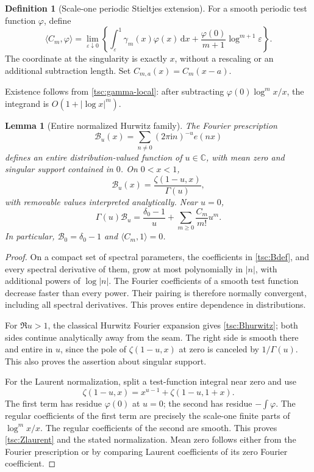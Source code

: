 \documentclass[11pt]{article}
\numberwithin{equation}{section}
\newtheorem{lemma}[theorem]{Lemma}
\theoremstyle{definition}\newtheorem{definition}[theorem]{Definition}
\theoremstyle{remark}\newtheorem{remark}[theorem]{Remark}
\newcommand{\ii}{\mathrm i}
\newcommand{\dd}{\,\mathrm d}
\newcommand{\CC}{\mathbb C}
\newcommand{\calB}{\mathcal B}
\begin{document}
\begin{definition}[Scale-one periodic Stieltjes extension]\label{tsc:Cdef}
For a smooth periodic test function $\varphi$, define
\begin{equation}\label{tsc:Cfp}
 \langle C_m,\varphi\rangle=
 \lim_{\varepsilon\downarrow0}\left\{
   \int_{\varepsilon}^{1}\gamma_m(x)\varphi(x)\dd x
    +\frac{\varphi(0)}{m+1}\log^{m+1}\varepsilon\right\}.
\end{equation}
The coordinate at the singularity is exactly $x$, without a rescaling or
an additional subtraction length. Set $C_{m,a}(x)=C_m(x-a)$.
\end{definition}
Existence follows from \eqref{tsc:gamma-local}: after subtracting
$\varphi(0)\log^m x/x$, the integrand is $O(1+|\log x|^m)$.

\begin{lemma}[Entire normalized Hurwitz family]\label{tsc:entire-B}
The Fourier prescription
\begin{equation}\label{tsc:Bdef}
 \calB_u(x)=\sum_{n\ne0}(2\pi\ii n)^{-u}e(nx)
\end{equation}
defines an entire distribution-valued function of $u\in\CC$, with mean
zero and singular support contained in $0$. On $0<x<1$,
\begin{equation}\label{tsc:Bhurwitz}
 \calB_u(x)=\frac{\zeta(1-u,x)}{\Gamma(u)},
\end{equation}
with removable values interpreted analytically. Near $u=0$,
\begin{equation}\label{tsc:Zlaurent}
 \Gamma(u)\calB_u=\frac{\delta_0-1}{u}
          +\sum_{m\ge0}\frac{C_m}{m!}u^m.
\end{equation}
In particular, $\calB_0=\delta_0-1$ and $\langle C_m,1\rangle=0$.
\end{lemma}
\begin{proof}
On a compact set of spectral parameters, the coefficients in
\eqref{tsc:Bdef}, and every spectral derivative of them, grow at most
polynomially in $|n|$, with additional powers of $\log|n|$. The Fourier
coefficients of a smooth test function decrease faster than every power.
Their pairing is therefore normally convergent, including all spectral
derivatives. This proves entire dependence in distributions.

For $\Re u>1$, the classical Hurwitz Fourier expansion
\cite[Eq.~25.11.9]{tsc:dlmf-zeta} gives \eqref{tsc:Bhurwitz}; both sides
continue analytically away from the seam. The right side is smooth there
and entire in $u$, since the pole of $\zeta(1-u,x)$ at zero is canceled by
$1/\Gamma(u)$. This also proves the assertion about singular support.

For the Laurent normalization, split a test-function integral near zero
and use
\[
 \zeta(1-u,x)=x^{u-1}+\zeta(1-u,1+x).
\]
The first term has residue $\varphi(0)$ at $u=0$; the second has residue
$-\int\varphi$. The regular coefficients of the first term are precisely
the scale-one finite parts of $\log^m x/x$. The regular coefficients of
the second are smooth. This proves \eqref{tsc:Zlaurent} and the stated
normalization. Mean zero follows either from the Fourier prescription or
by comparing Laurent coefficients of its zero Fourier coefficient.
\end{proof}
\end{document}
